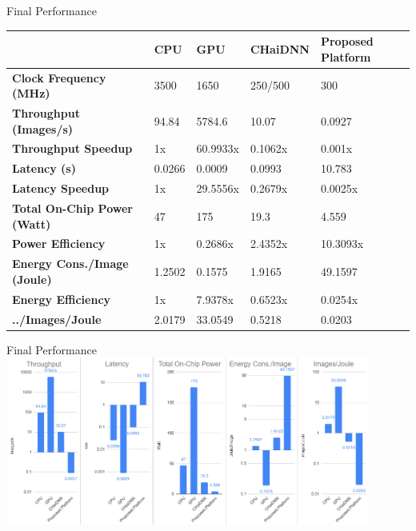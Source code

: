 \begin{frame}{Final Performance}
	\begin{table}[H]
		\centering
		\begin{tabular}{l|l|l|l|l}
			\toprule
			                                    & \textbf{CPU} & \textbf{GPU} & \textbf{CHaiDNN} & \textbf{Proposed Platform} \\
			\midrule
			\textbf{Clock Frequency (MHz)}      & 3500         & 1650         & 250/500          & 300                        \\
			\textbf{Throughput (Images/s)}      & 94.84        & 5784.6       & 10.07            & 0.0927                     \\
			\textbf{Throughput Speedup}         & 1x           & 60.9933x     & 0.1062x          & 0.001x                     \\
			\textbf{Latency (s)}                & 0.0266       & 0.0009       & 0.0993           & 10.783                     \\
			\textbf{Latency Speedup}            & 1x           & 29.5556x     & 0.2679x          & 0.0025x                    \\
			\textbf{Total On-Chip Power (Watt)} & 47           & 175          & 19.3             & 4.559                      \\
			\textbf{Power Efficiency}           & 1x           & 0.2686x      & 2.4352x          & 10.3093x                   \\
			\textbf{Energy Cons./Image (Joule)} & 1.2502       & 0.1575       & 1.9165           & 49.1597                    \\
			\textbf{Energy Efficiency}          & 1x           & 7.9378x      & 0.6523x          & 0.0254x                    \\
			\textbf{../Images/Joule}            & 2.0179       & 33.0549      & 0.5218           & 0.0203                     \\
			\bottomrule
		\end{tabular}
	\end{table}
\end{frame}

\begin{frame}{Final Performance}
	\centering
	\includegraphics[width=0.9\textwidth]{../Images/Results/Final-Results-charts.png}\\
\end{frame}
